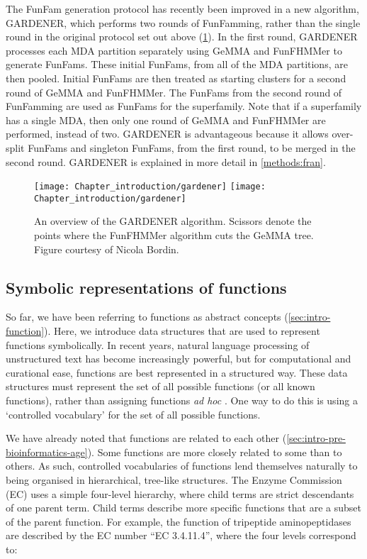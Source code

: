 The FunFam generation protocol has recently been improved in a new algorithm, GARDENER, which performs two rounds of FunFamming, rather than the single round in the original protocol set out above (\ref{fig:gardener}). In the first round, GARDENER processes each MDA partition separately using GeMMA and FunFHMMer to generate FunFams. These initial FunFams, from all of the MDA partitions, are then pooled. Initial FunFams are then treated as starting clusters for a second round of GeMMA and FunFHMMer. The FunFams from the second round of FunFamming are used as FunFams for the superfamily. Note that if a superfamily has a single MDA, then only one round of GeMMA and FunFHMMer are performed, instead of two. GARDENER is advantageous because it allows over-split FunFams and singleton FunFams, from the first round, to be merged in the second round. GARDENER is explained in more detail in \ref{methods:fran}.

\begin{figure}[!hbt]
    \centering
    \ifredact
        \texttt{[image: Chapter\_introduction/gardener]}
    \else
        \texttt{[image: Chapter\_introduction/gardener]}
    \fi
    \caption{%
        An overview of the GARDENER algorithm.
        Scissors denote the points where the FunFHMMer algorithm cuts the GeMMA tree.
        Figure courtesy of Nicola Bordin.
    }
    \label{fig:gardener}
\end{figure}

\subsection{Symbolic representations of functions}

So far, we have been referring to functions as abstract concepts (\ref{sec:intro-function}). Here, we introduce data structures that are used to represent functions symbolically. In recent years, natural language processing of unstructured text has become increasingly powerful, but for computational and curational ease, functions are best represented in a structured way. These data structures must represent the set of all possible functions (or all known functions), rather than assigning functions \emph{ad hoc} \cite{Lee2007}. One way to do this is using a `controlled vocabulary' for the set of all possible functions.

We have already noted that functions are related to each other (\ref{sec:intro-pre-bioinformatics-age}). Some functions are more closely related to some than to others. As such, controlled vocabularies of functions lend themselves naturally to being organised in hierarchical, tree-like structures. The Enzyme Commission (EC) \cite{Bairoch2000} uses a simple four-level hierarchy, where child terms are strict descendants of one parent term. Child terms describe more specific functions that are a subset of the parent function. For example, the function of tripeptide aminopeptidases are described by the EC number ``EC 3.4.11.4'', where the four levels correspond to:

